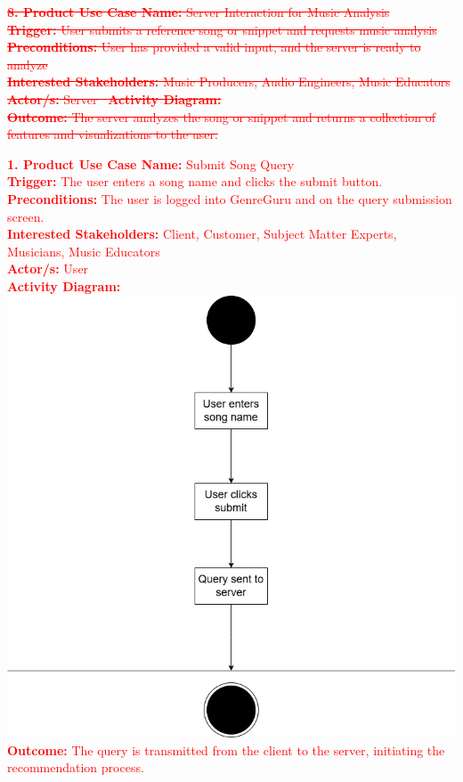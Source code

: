 \documentclass[12pt]{article}
\begin{document}
\textcolor{red}{\sout{\textbf{8. Product Use Case Name:} Server Interaction for Music Analysis}} \\
\textcolor{red}{\sout{\textbf{Trigger:} User submits a reference song or snippet and requests music analysis}} \\
\textcolor{red}{\sout{\textbf{Preconditions:} User has provided a valid input, and the server is ready to analyze}} \\
\textcolor{red}{\sout{\textbf{Interested Stakeholders:} Music Producers, Audio Engineers, Music Educators}}\\
\textcolor{red}{\sout{\textbf{Actor/s:} Server \ \textbf{Activity Diagram:}}} \\
\textcolor{red}{\sout{\textbf{Outcome:} The server analyzes the song or snippet and returns a collection of features and visualizations to the user.}}

\vspace{2cm}

\noindent\textcolor{red}{\textbf{1. Product Use Case Name:} Submit Song Query} \\
\textcolor{red}{\textbf{Trigger:} The user enters a song name and clicks the submit button.} \\
\textcolor{red}{\textbf{Preconditions:} The user is logged into GenreGuru and on the query submission screen.} \\
\textcolor{red}{\textbf{Interested Stakeholders:} Client, Customer, Subject Matter Experts, Musicians, Music Educators} \\
\textcolor{red}{\textbf{Actor/s:} User} \\
\textcolor{red}{\textbf{Activity Diagram:}} \\
\includegraphics[width=\textwidth]{PUC1.drawio.png}
\textcolor{red}{\textbf{Outcome:} The query is transmitted from the client to the server, initiating the recommendation process.} \\
\end{document}
